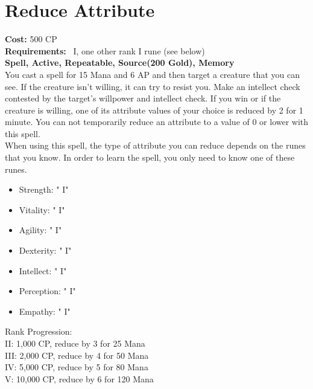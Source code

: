 \section{Reduce Attribute}\label{spell:reduceAbility}
\textbf{Cost:} 500 CP\\
\textbf{Requirements:}~ I, one other rank I rune (see below)\\
\textbf{Spell, Active, Repeatable, Source(200 Gold), Memory}\\
You cast a spell for 15 Mana and 6 AP and then target a creature that you can see.
If the creature isn't willing, it can try to resist you.
Make an intellect check contested by the target's willpower and intellect check.
If you win or if the creature is willing, one of its attribute values of your choice is reduced by 2 for 1 minute.
You can not temporarily reduce an attribute to a value of 0 or lower with this spell. \\
When using this spell, the type of attribute you can reduce depends on the runes that you know.
In order to learn the spell, you only need to know one of these runes.\\
\begin{itemize}
    \item Strength: " I"
    \item Vitality: " I"
    \item Agility: " I"
    \item Dexterity: " I"
    \item Intellect: " I"
    \item Perception: " I"
    \item Empathy: " I"
\end{itemize}
Rank Progression:\\
II: 1,000 CP, reduce by 3 for 25 Mana\\
III: 2,000 CP, reduce by 4 for 50 Mana\\
IV: 5,000 CP, reduce by 5 for 80 Mana\\
V: 10,000 CP, reduce by 6 for 120 Mana\\